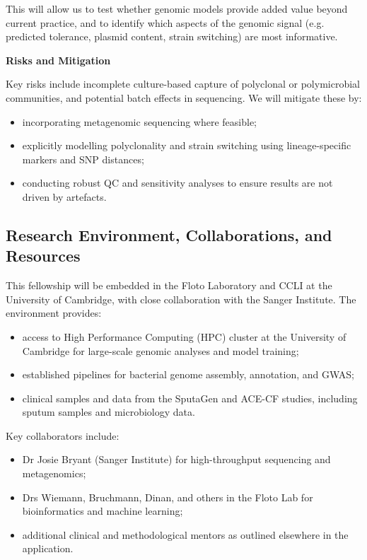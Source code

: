 This will allow us to test whether genomic models provide added value beyond current practice, 
and to identify which aspects of the genomic signal (e.g. predicted tolerance, plasmid content, strain switching) are most informative.

\textbf{Risks and Mitigation}

Key risks include incomplete culture-based capture of polyclonal or polymicrobial communities, 
and potential batch effects in sequencing. We will mitigate these by:

\begin{itemize}
  \item incorporating metagenomic sequencing where feasible;
  \item explicitly modelling polyclonality and strain switching using lineage-specific markers and SNP distances;
  \item conducting robust QC and sensitivity analyses to ensure results are not driven by artefacts.
\end{itemize}

\subsection*{Research Environment, Collaborations, and Resources}

This fellowship will be embedded in the Floto Laboratory and CCLI at the University of Cambridge, 
with close collaboration with the Sanger Institute. The environment provides:

\begin{itemize}
  \item access to High Performance Computing (HPC) cluster at the University of Cambridge 
  for large-scale genomic analyses and model training;
  \item established pipelines for bacterial genome assembly, annotation, and GWAS;
  \item clinical samples and data from the SputaGen and ACE-CF studies, including sputum samples and microbiology data.
\end{itemize}

Key collaborators include:

\begin{itemize}
  \item Dr Josie Bryant (Sanger Institute) for high-throughput sequencing and metagenomics;
  \item Drs Wiemann, Bruchmann, Dinan, and others in the Floto Lab for bioinformatics and machine learning;
  \item additional clinical and methodological mentors as outlined elsewhere in the application.
\end{itemize}

